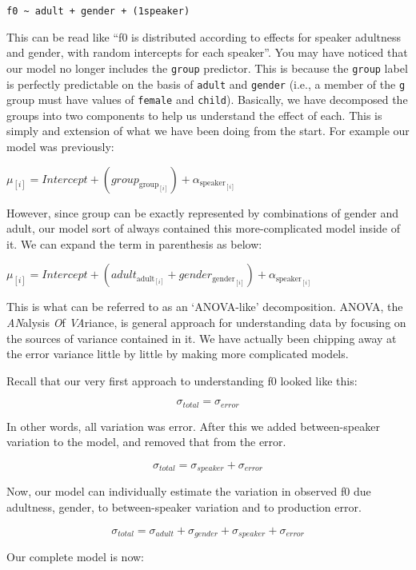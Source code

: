 \documentclass[
]{book}
\begin{document}
\texttt{f0\ \textasciitilde{}\ adult\ +\ gender\ +\ (1\textbar{}speaker)}

This can be read like ``f0 is distributed according to effects for speaker adultness and gender, with random intercepts for each speaker''. You may have noticed that our model no longer includes the \texttt{group} predictor. This is because the \texttt{group} label is perfectly predictable on the basis of \texttt{adult} and \texttt{gender} (i.e., a member of the \texttt{g} group must have values of \texttt{female} and \texttt{child}). Basically, we have decomposed the groups into two components to help us understand the effect of each. This is simply and extension of what we have been doing from the start. For example our model was previously:

\(\mu_{[i]} = Intercept + (group_{\mathrm{group}_{[i]}}) + \alpha_{\mathrm{speaker}_{[i]}}\)

However, since group can be exactly represented by combinations of gender and adult, our model sort of always contained this more-complicated model inside of it. We can expand the term in parenthesis as below:

\(\mu_{[i]} = Intercept + (adult_{\mathrm{adult}_{[i]}} + gender_{\mathrm{gender}_{[i]}}) + \alpha_{\mathrm{speaker}_{[i]}}\)

This is what can be referred to as an `ANOVA-like' decomposition. ANOVA, the \emph{AN}alysis \emph{O}f \emph{VA}riance, is general approach for understanding data by focusing on the sources of variance contained in it. We have actually been chipping away at the error variance little by little by making more complicated models.

Recall that our very first approach to understanding f0 looked like this:

\[
\sigma_{total} = \sigma_{error}
\]

In other words, all variation was error. After this we added between-speaker variation to the model, and removed that from the error.

\[
\sigma_{total} = \sigma_{speaker} + \sigma_{error}
\]

Now, our model can individually estimate the variation in observed f0 due adultness, gender, to between-speaker variation and to production error.

\[
\sigma_{total} = \sigma_{adult} + \sigma_{gender}+\sigma_{speaker} + \sigma_{error}
\]

Our complete model is now:
\end{document}
